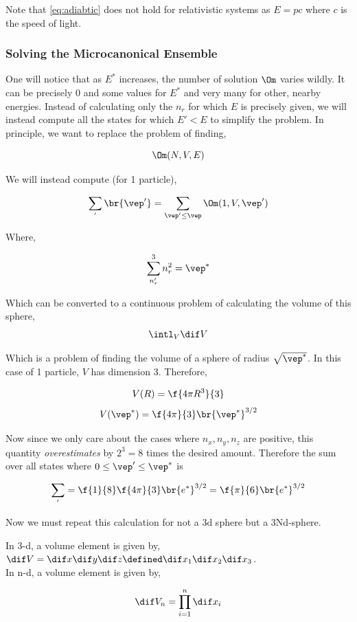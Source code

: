 \documentclass{article}
\begin{document}
Note that \eqref{eq:adiabtic} does not hold for relativistic systems as $E = pc$ where $c$ is the speed of light.

\subsubsection{Solving the Microcanonical Ensemble}
\label{sec:solvemircoensemble}

One will notice that as $E^*$ increases, the number of solution $\Om$ varies wildly. It can be precisely $0$ and some values for $E^*$ and very many for other, nearby energies. Instead of calculating only the $n_r$ for which $E$ is precisely given, we will instead compute all the states for which $E' < E$ to simplify the problem. In principle, we want to replace the problem of finding,

\[ \Om(N, V, E) \]

We will instead compute (for 1 particle),

\[ \sum_{'} \br{\vep'} = \sum_{\vep' \leq \vep} \Om(1, V, \vep') \]

Where,

\[ \sum_{n_r'}^{3} n_r^2 = \vep^* \]

Which can be converted to a continuous problem of calculating the volume of this sphere,
\[ \intl_V \dif V \]

Which is a problem of finding the volume of a sphere of radius $\sqrt{\vep^*}$. In this case of 1 particle, $V$ has dimension $3$. Therefore,

\[ V(R) = \f{4 \pi R^3}{3} \]
\[ V(\vep^*) = \f{4 \pi }{3}\br{\vep^*}^{3/2} \]

Now since we only care about the cases where $n_x, n_y, n_z$ are positive, this quantity \textit{overestimates} by $2^3= 8$ times the desired amount. Therefore the sum over all states where $0 \leq \vep'\leq\vep^*$ is

\[ \sum_{'} = \f{1}{8} \f{4\pi}{3} \br{e^*}^{3/2} = \f{\pi}{6} \br{e^*}^{3/2} \]

Now we must repeat this calculation for not a 3d sphere but a 3Nd-sphere.


In 3-d, a volume element is given by, $\dif V = \dif x \dif y \dif z \defined \dif x_1\dif x_2\dif x_3$. \\

In n-d, a volume element is given by,

\[ \dif V_n = \prod_{i=1}^{n} \dif x_i \]
\end{document}

